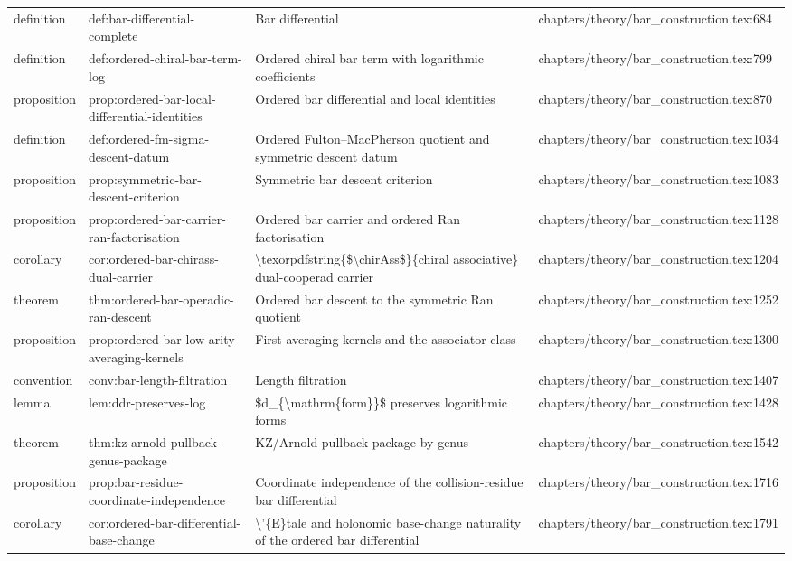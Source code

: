 \documentclass[11pt]{article}
\begin{document}
\begin{longtable}{L{0.10\textwidth}L{0.26\textwidth}L{0.42\textwidth}L{0.22\textwidth}}
definition & def:bar-differential-complete & Bar differential & chapters/theory/bar\_construction.tex:684\\
definition & def:ordered-chiral-bar-term-log & Ordered chiral bar term with logarithmic coefficients & chapters/theory/bar\_construction.tex:799\\
proposition & prop:ordered-bar-local-differential-identities & Ordered bar differential and local identities & chapters/theory/bar\_construction.tex:870\\
definition & def:ordered-fm-sigma-descent-datum & Ordered Fulton--MacPherson quotient and symmetric descent datum & chapters/theory/bar\_construction.tex:1034\\
proposition & prop:symmetric-bar-descent-criterion & Symmetric bar descent criterion & chapters/theory/bar\_construction.tex:1083\\
proposition & prop:ordered-bar-carrier-ran-factorisation & Ordered bar carrier and ordered Ran factorisation & chapters/theory/bar\_construction.tex:1128\\
corollary & cor:ordered-bar-chirass-dual-carrier & \textbackslash{}texorpdfstring\{\$\textbackslash{}chirAss\$\}\{chiral associative\} dual-cooperad carrier & chapters/theory/bar\_construction.tex:1204\\
theorem & thm:ordered-bar-operadic-ran-descent & Ordered bar descent to the symmetric Ran quotient & chapters/theory/bar\_construction.tex:1252\\
proposition & prop:ordered-bar-low-arity-averaging-kernels & First averaging kernels and the associator class & chapters/theory/bar\_construction.tex:1300\\
convention & conv:bar-length-filtration & Length filtration & chapters/theory/bar\_construction.tex:1407\\
lemma & lem:ddr-preserves-log & \$d\_\{\textbackslash{}mathrm\{form\}\}\$ preserves logarithmic forms & chapters/theory/bar\_construction.tex:1428\\
theorem & thm:kz-arnold-pullback-genus-package & KZ/Arnold pullback package by genus & chapters/theory/bar\_construction.tex:1542\\
proposition & prop:bar-residue-coordinate-independence & Coordinate independence of the collision-residue bar differential & chapters/theory/bar\_construction.tex:1716\\
corollary & cor:ordered-bar-differential-base-change & \textbackslash{}'\{E\}tale and holonomic base-change naturality of the ordered bar differential & chapters/theory/bar\_construction.tex:1791\\

\end{longtable}
\end{document}
